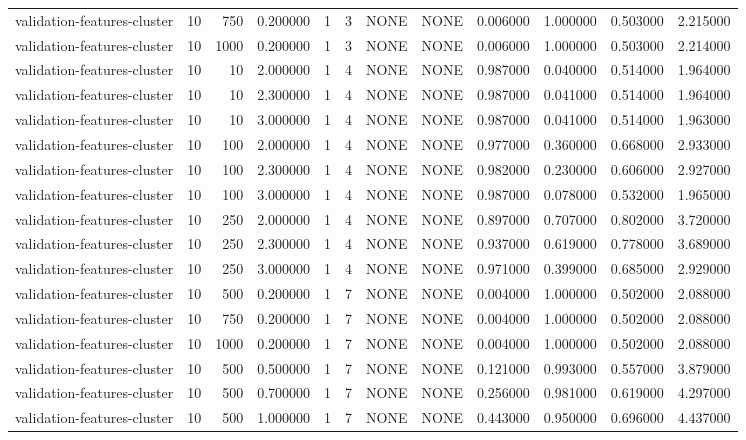 \begin{tabular}{lrrrllllrrrr}
validation-features-cluster & 10 & 750 & 0.200000 & 1 & 3 & NONE & NONE & 0.006000 & 1.000000 & 0.503000 & 2.215000 \\
validation-features-cluster & 10 & 1000 & 0.200000 & 1 & 3 & NONE & NONE & 0.006000 & 1.000000 & 0.503000 & 2.214000 \\
validation-features-cluster & 10 & 10 & 2.000000 & 1 & 4 & NONE & NONE & 0.987000 & 0.040000 & 0.514000 & 1.964000 \\
validation-features-cluster & 10 & 10 & 2.300000 & 1 & 4 & NONE & NONE & 0.987000 & 0.041000 & 0.514000 & 1.964000 \\
validation-features-cluster & 10 & 10 & 3.000000 & 1 & 4 & NONE & NONE & 0.987000 & 0.041000 & 0.514000 & 1.963000 \\
validation-features-cluster & 10 & 100 & 2.000000 & 1 & 4 & NONE & NONE & 0.977000 & 0.360000 & 0.668000 & 2.933000 \\
validation-features-cluster & 10 & 100 & 2.300000 & 1 & 4 & NONE & NONE & 0.982000 & 0.230000 & 0.606000 & 2.927000 \\
validation-features-cluster & 10 & 100 & 3.000000 & 1 & 4 & NONE & NONE & 0.987000 & 0.078000 & 0.532000 & 1.965000 \\
validation-features-cluster & 10 & 250 & 2.000000 & 1 & 4 & NONE & NONE & 0.897000 & 0.707000 & 0.802000 & 3.720000 \\
validation-features-cluster & 10 & 250 & 2.300000 & 1 & 4 & NONE & NONE & 0.937000 & 0.619000 & 0.778000 & 3.689000 \\
validation-features-cluster & 10 & 250 & 3.000000 & 1 & 4 & NONE & NONE & 0.971000 & 0.399000 & 0.685000 & 2.929000 \\
validation-features-cluster & 10 & 500 & 0.200000 & 1 & 7 & NONE & NONE & 0.004000 & 1.000000 & 0.502000 & 2.088000 \\
validation-features-cluster & 10 & 750 & 0.200000 & 1 & 7 & NONE & NONE & 0.004000 & 1.000000 & 0.502000 & 2.088000 \\
validation-features-cluster & 10 & 1000 & 0.200000 & 1 & 7 & NONE & NONE & 0.004000 & 1.000000 & 0.502000 & 2.088000 \\
validation-features-cluster & 10 & 500 & 0.500000 & 1 & 7 & NONE & NONE & 0.121000 & 0.993000 & 0.557000 & 3.879000 \\
validation-features-cluster & 10 & 500 & 0.700000 & 1 & 7 & NONE & NONE & 0.256000 & 0.981000 & 0.619000 & 4.297000 \\
validation-features-cluster & 10 & 500 & 1.000000 & 1 & 7 & NONE & NONE & 0.443000 & 0.950000 & 0.696000 & 4.437000 \\

\end{tabular}
